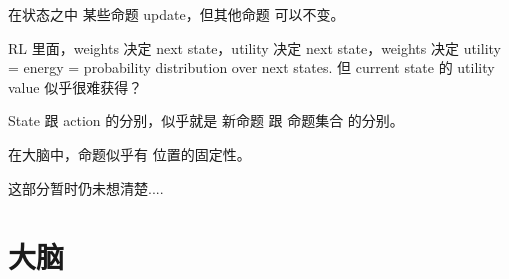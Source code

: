 \begin{preview}
\begin{minipage}{\textwidth}
在状态之中 某些命题 update，但其他命题 可以不变。 

RL 里面，weights 决定 next state，utility 决定 next state，weights 决定 utility = energy = probability distribution over next states.  但 current state 的 utility value 似乎很难获得？  

State 跟 action 的分别，似乎就是 新命题 跟 命题集合 的分别。 

在大脑中，命题似乎有 位置的固定性。 

\underconst \quad 这部分暂时仍未想清楚....

\section{大脑}

\end{minipage}
\end{preview}


